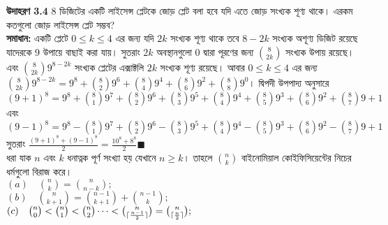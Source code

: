 \documentclass{article}
\DeclarePairedDelimiter{\ceil}{\lceil}{\rceil}
\begin{document}
\textbf{উদাহরণ 3.4} 8 ডিজিটের  একটি লাইসেন্স প্লেটকে জোড় প্লেট বলা হবে যদি এতে জোড় সংখ্যক শূণ্য থাকে। এরকম কতগুলো জোড় লাইসেন্স প্লেট সম্ভব?\\
\textbf{সমাধান:} একটি প্লেটে $0\le k \le 4$ এর জন্য যদি $2k$ সংখ্যক শূণ্য থাকে তবে $8-2k$ সংখ্যক অশূণ্য ডিজিট রয়েছে যাদেরকে 9 উপায়ে বাছাই করা যায়। সুতরাং $2k$ অবস্থানগুলো $0$ দ্বারা পূরণের জন্য $\binom{8}{2k}$ সংখ্যক উপায় রয়েছে। এবং $\binom{8}{2k}9^{8-2k}$ সংখ্যক  প্লেটের এক্সাক্টলি $2k$ সংখ্যক শূণ্য রয়েছে। আবার $0\le k \le 4$ এর জন্য  $\binom{8}{2k}9^{8-2k} = 9^8 + \binom{8}{2}9^6 + \binom{8}{4}9^4 + \binom{8}{6}9^2 + \binom{8}{8}9^0 $। দ্বিপদী উপপাদ্য অনুসারে $(9+1)^8 = 9^8 + \binom{8}{1}9^7 + \binom{8}{2}9^6 + \binom{8}{3}9^5 + \binom{8}{4}9^4 + \binom{8}{5}9^3 + \binom{8}{6}9^2 + \binom{8}{7}9 + 1$ এবং $(9-1)^8 = 9^8 - \binom{8}{1}9^7 + \binom{8}{2}9^6 - \binom{8}{3}9^5 + \binom{8}{4}9^4 - \binom{8}{5}9^3 + \binom{8}{6}9^2 - \binom{8}{7}9 + 1$ সুতরাং $\frac{(9+1)^8 + (9-1)^8}{2} = \frac{10^8 + 8^8}{2}\blacksquare$\\

ধরা যাক $n$ এবং $k$ ধনাত্নক পূর্ণ সংখ্যা হয় যেখানে $n\ge k$। তাহলে $\binom{n}{k}$ বাইনোমিয়াল কোইফিসিয়েন্টের নিচের ধর্মগুলো বিরাজ করে।\\
$(a)\quad \binom{n}{k} = \binom{n}{n-k};$\\
$(b)\quad \binom{n}{k+1} = \binom{n-1}{k+1} + \binom{n-1}{k};$\\
$(c)\quad \binom{n}{0} < \binom{n}{1} < \binom{n}{2} \cdots < \binom{n}{\ceil{\frac{n-1}{2}}} = \binom{n}{\ceil{\frac{n}{2}}};$\\
\end{document}
